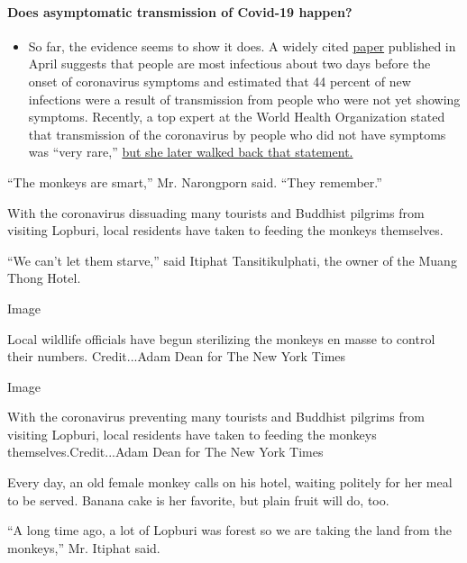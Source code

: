 \begin{itemize}
{  \paragraph{Does asymptomatic transmission of Covid-19
  happen?}\label{does-asymptomatic-transmission-of-covid-19-happen}}

  \begin{itemize}
  \tightlist
  \item
    So far, the evidence seems to show it does. A widely cited
    \href{https://www.nature.com/articles/s41591-020-0869-5}{paper}
    published in April suggests that people are most infectious about
    two days before the onset of coronavirus symptoms and estimated that
    44 percent of new infections were a result of transmission from
    people who were not yet showing symptoms. Recently, a top expert at
    the World Health Organization stated that transmission of the
    coronavirus by people who did not have symptoms was ``very rare,''
    \href{https://www.nytimes.com/2020/06/09/world/coronavirus-updates.html?action=click\&pgtype=Article\&state=default\&region=MAIN_CONTENT_3\&context=storylines_faq\#link-1f302e21}{but
    she later walked back that statement.}
  \end{itemize}
\end{itemize}

``The monkeys are smart,'' Mr. Narongporn said. ``They remember.''

With the coronavirus dissuading many tourists and Buddhist pilgrims from
visiting Lopburi, local residents have taken to feeding the monkeys
themselves.

``We can't let them starve,'' said Itiphat Tansitikulphati, the owner of
the Muang Thong Hotel.

Image

Local wildlife officials have begun sterilizing the monkeys en masse to
control their numbers. Credit...Adam Dean for The New York Times

Image

With the coronavirus preventing many tourists and Buddhist pilgrims from
visiting Lopburi, local residents have taken to feeding the monkeys
themselves.Credit...Adam Dean for The New York Times

Every day, an old female monkey calls on his hotel, waiting politely for
her meal to be served. Banana cake is her favorite, but plain fruit will
do, too.

``A long time ago, a lot of Lopburi was forest so we are taking the land
from the monkeys,'' Mr. Itiphat said.

